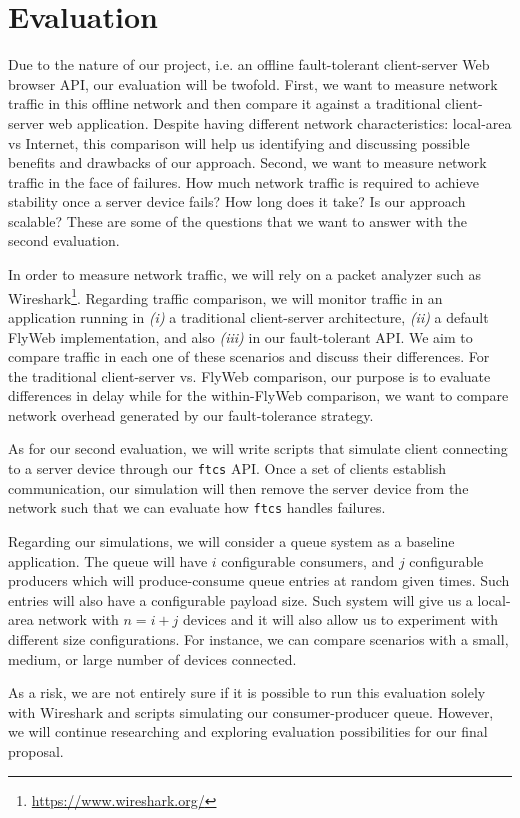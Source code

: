 \section{Evaluation}
\label{sec:evaluation}

Due to the nature of our project, i.e. an offline fault-tolerant client-server Web browser API, our evaluation will be twofold. First, we want to measure network traffic in this offline network and then compare it against a traditional client-server web application. Despite having different network characteristics: local-area vs Internet, this comparison will help us identifying and discussing possible benefits and drawbacks of our approach. Second, we want to measure network traffic in the face of failures. How much network traffic is required to achieve stability once a server device fails? How long does it take? Is our approach scalable? These are some of the questions that we want to answer with the second evaluation.

In order to measure network traffic, we will rely on a packet analyzer such as Wireshark\footnote{\url{https://www.wireshark.org/}}. Regarding traffic comparison, we will monitor traffic in an application running in {\it (i)} a traditional client-server architecture, {\it (ii)} a default FlyWeb implementation, and also {\it (iii)} in our fault-tolerant API. We aim to compare traffic in each one of these scenarios and discuss their differences. For the traditional client-server vs. FlyWeb comparison, our purpose is to evaluate differences in delay while for the within-FlyWeb comparison, we want to compare network overhead generated by our fault-tolerance strategy. 

As for our second evaluation, we will write scripts that simulate client connecting to a server device through our \texttt{ftcs} API. Once a set of clients establish communication, our simulation will then remove the server device from the network such that we can evaluate how \texttt{ftcs} handles failures. 

Regarding our simulations, we will consider a queue system as a baseline application. The queue will have $i$ configurable consumers, and $j$ configurable producers which will produce-consume queue entries at random given times. Such entries will also have a configurable payload size. Such system will give us a local-area network with $n = i + j$ devices and it will also allow us to experiment with different size configurations. For instance, we can compare scenarios with a small, medium, or large number of devices connected.

As a risk, we are not entirely sure if it is possible to run this evaluation solely with Wireshark and scripts simulating our consumer-producer queue. However, we will continue researching and exploring evaluation possibilities for our final proposal.